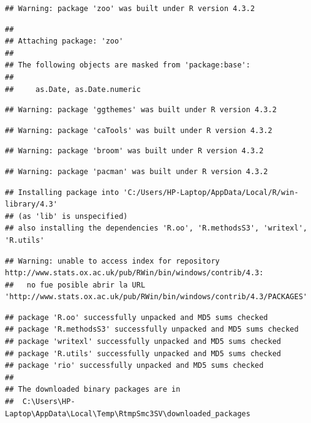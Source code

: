 \documentclass[
]{article}
\begin{document}
\begin{verbatim}
## Warning: package 'zoo' was built under R version 4.3.2
\end{verbatim}

\begin{verbatim}
## 
## Attaching package: 'zoo'
## 
## The following objects are masked from 'package:base':
## 
##     as.Date, as.Date.numeric
\end{verbatim}

\begin{verbatim}
## Warning: package 'ggthemes' was built under R version 4.3.2
\end{verbatim}

\begin{verbatim}
## Warning: package 'caTools' was built under R version 4.3.2
\end{verbatim}

\begin{verbatim}
## Warning: package 'broom' was built under R version 4.3.2
\end{verbatim}

\begin{verbatim}
## Warning: package 'pacman' was built under R version 4.3.2
\end{verbatim}

\begin{verbatim}
## Installing package into 'C:/Users/HP-Laptop/AppData/Local/R/win-library/4.3'
## (as 'lib' is unspecified)
## also installing the dependencies 'R.oo', 'R.methodsS3', 'writexl', 'R.utils'
\end{verbatim}

\begin{verbatim}
## Warning: unable to access index for repository http://www.stats.ox.ac.uk/pub/RWin/bin/windows/contrib/4.3:
##   no fue posible abrir la URL 'http://www.stats.ox.ac.uk/pub/RWin/bin/windows/contrib/4.3/PACKAGES'
\end{verbatim}

\begin{verbatim}
## package 'R.oo' successfully unpacked and MD5 sums checked
## package 'R.methodsS3' successfully unpacked and MD5 sums checked
## package 'writexl' successfully unpacked and MD5 sums checked
## package 'R.utils' successfully unpacked and MD5 sums checked
## package 'rio' successfully unpacked and MD5 sums checked
## 
## The downloaded binary packages are in
##  C:\Users\HP-Laptop\AppData\Local\Temp\RtmpSmc3SV\downloaded_packages
\end{verbatim}
\end{document}
